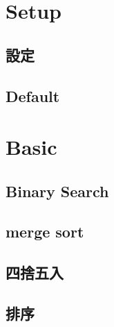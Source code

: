 \documentclass[a4paper,10pt,twocolumn,oneside]{article}
\begin{document}
\pagestyle{fancy}
\fancyfoot{}
\renewcommand{\headrulewidth}{0.4pt}
\renewcommand{\contentsname}{Contents} 

\scriptsize
\tableofcontents




% 

\section{Setup}

\subsection{設定}


\subsection{Default}


% 

\section{Basic}

\subsection{Binary Search}


\subsection{merge sort}


\subsection{四捨五入}


\subsection{排序}

\end{document}
